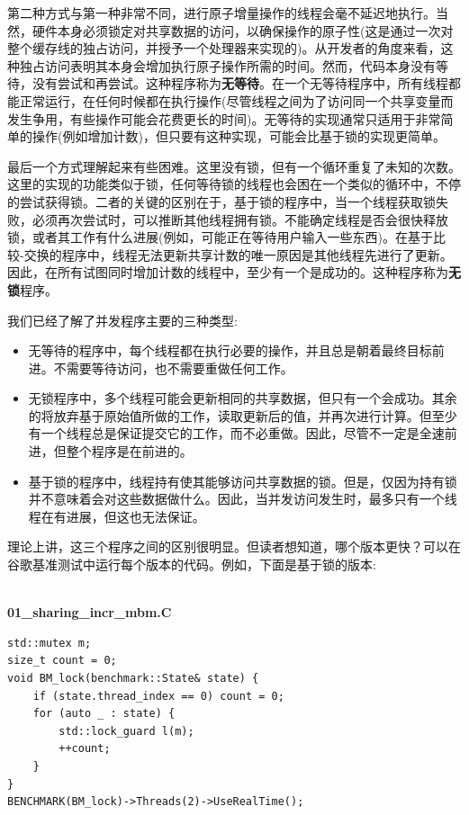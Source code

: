 第二种方式与第一种非常不同，进行原子增量操作的线程会毫不延迟地执行。当然，硬件本身必须锁定对共享数据的访问，以确保操作的原子性(这是通过一次对整个缓存线的独占访问，并授予一个处理器来实现的)。从开发者的角度来看，这种独占访问表明其本身会增加执行原子操作所需的时间。然而，代码本身没有等待，没有尝试和再尝试。这种程序称为\textbf{无等待}。在一个无等待程序中，所有线程都能正常运行，在任何时候都在执行操作(尽管线程之间为了访问同一个共享变量而发生争用，有些操作可能会花费更长的时间)。无等待的实现通常只适用于非常简单的操作(例如增加计数)，但只要有这种实现，可能会比基于锁的实现更简单。

最后一个方式理解起来有些困难。这里没有锁，但有一个循环重复了未知的次数。这里的实现的功能类似于锁，任何等待锁的线程也会困在一个类似的循环中，不停的尝试获得锁。二者的关键的区别在于，基于锁的程序中，当一个线程获取锁失败，必须再次尝试时，可以推断其他线程拥有锁。不能确定线程是否会很快释放锁，或者其工作有什么进展(例如，可能正在等待用户输入一些东西)。在基于比较-交换的程序中，线程无法更新共享计数的唯一原因是其他线程先进行了更新。因此，在所有试图同时增加计数的线程中，至少有一个是成功的。这种程序称为\textbf{无锁}程序。

我们已经了解了并发程序主要的三种类型:

\begin{itemize}
\item 
无等待的程序中，每个线程都在执行必要的操作，并且总是朝着最终目标前进。不需要等待访问，也不需要重做任何工作。

\item 
无锁程序中，多个线程可能会更新相同的共享数据，但只有一个会成功。其余的将放弃基于原始值所做的工作，读取更新后的值，并再次进行计算。但至少有一个线程总是保证提交它的工作，而不必重做。因此，尽管不一定是全速前进，但整个程序是在前进的。

\item 
基于锁的程序中，线程持有使其能够访问共享数据的锁。但是，仅因为持有锁并不意味着会对这些数据做什么。因此，当并发访问发生时，最多只有一个线程在有进展，但这也无法保证。
\end{itemize}

理论上讲，这三个程序之间的区别很明显。但读者想知道，哪个版本更快？可以在谷歌基准测试中运行每个版本的代码。例如，下面是基于锁的版本:

\hspace*{\fill} \\ %
\noindent
\textbf{01\_sharing\_incr\_mbm.C}
\begin{lstlisting}[style=styleCXX]
std::mutex m;
size_t count = 0;
void BM_lock(benchmark::State& state) {
	if (state.thread_index == 0) count = 0;
	for (auto _ : state) {
		std::lock_guard l(m);
		++count;
	}
}
BENCHMARK(BM_lock)->Threads(2)->UseRealTime();
\end{lstlisting}

